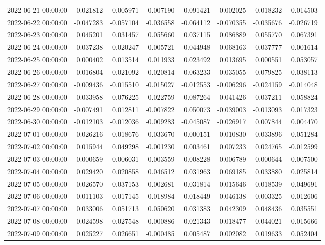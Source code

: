 \begin{tabular}{lrrrrrrr}
2022-06-21 00:00:00 & -0.021812 & 0.005971 & 0.007190 & 0.091421 & -0.002025 & -0.018232 & 0.014503 \\
2022-06-22 00:00:00 & -0.047283 & -0.057104 & -0.036558 & -0.064112 & -0.070355 & -0.035676 & -0.026719 \\
2022-06-23 00:00:00 & 0.045201 & 0.031457 & 0.055660 & 0.037115 & 0.086889 & 0.055770 & 0.067391 \\
2022-06-24 00:00:00 & 0.037238 & -0.020247 & 0.005721 & 0.044948 & 0.068163 & 0.037777 & 0.001614 \\
2022-06-25 00:00:00 & 0.000402 & 0.013514 & 0.011933 & 0.023492 & 0.013695 & 0.000551 & 0.053057 \\
2022-06-26 00:00:00 & -0.016804 & -0.021092 & -0.020814 & 0.063233 & -0.035055 & -0.079825 & -0.038113 \\
2022-06-27 00:00:00 & -0.009436 & -0.015510 & -0.015027 & -0.012553 & -0.006296 & -0.024159 & -0.014048 \\
2022-06-28 00:00:00 & -0.033958 & -0.076225 & -0.022759 & -0.087264 & -0.041426 & -0.037211 & -0.058824 \\
2022-06-29 00:00:00 & -0.007491 & 0.012811 & -0.007822 & 0.050073 & -0.039003 & -0.013093 & 0.017323 \\
2022-06-30 00:00:00 & -0.012103 & -0.012036 & -0.009283 & -0.045087 & -0.026917 & 0.007844 & 0.004470 \\
2022-07-01 00:00:00 & -0.026216 & -0.018676 & -0.033670 & -0.000151 & -0.010830 & -0.033896 & -0.051284 \\
2022-07-02 00:00:00 & 0.015944 & 0.049298 & -0.001230 & 0.003461 & 0.007233 & 0.024765 & -0.012599 \\
2022-07-03 00:00:00 & 0.000659 & -0.006031 & 0.003559 & 0.008228 & 0.006789 & -0.000644 & 0.007500 \\
2022-07-04 00:00:00 & 0.029420 & 0.020858 & 0.046512 & 0.031963 & 0.069185 & 0.033880 & 0.025814 \\
2022-07-05 00:00:00 & -0.026570 & -0.037153 & -0.002681 & -0.031814 & -0.015646 & -0.018539 & -0.049691 \\
2022-07-06 00:00:00 & 0.011103 & 0.017145 & 0.018984 & 0.018449 & 0.046138 & 0.003325 & 0.012606 \\
2022-07-07 00:00:00 & 0.033006 & 0.051713 & 0.050620 & 0.031383 & 0.042309 & 0.048436 & 0.035551 \\
2022-07-08 00:00:00 & -0.024598 & -0.027548 & -0.000886 & -0.021343 & -0.018477 & -0.044021 & -0.015666 \\
2022-07-09 00:00:00 & 0.025227 & 0.026651 & -0.000485 & 0.005487 & 0.002082 & 0.019633 & 0.052404 \\

\end{tabular}

